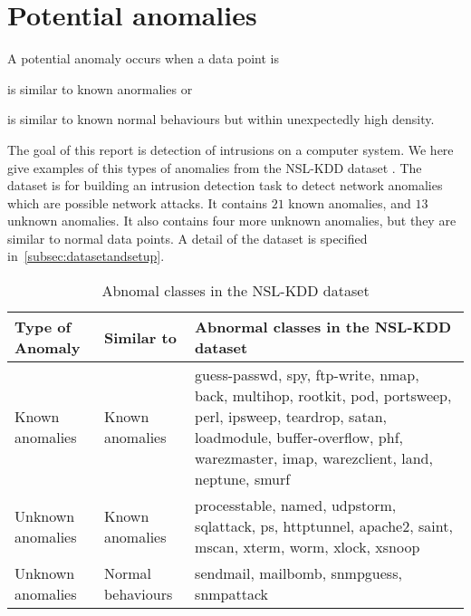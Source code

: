 \section{Potential anomalies}
A potential anomaly occurs when a data point is \begin{inparaenum}
\item is similar to known anormalies %
or 
\item is similar to known normal behaviours but within unexpectedly high density.
\end{inparaenum} 

The goal of this report is detection of intrusions on a computer system. 
We here give examples of this types of anomalies from the NSL-KDD dataset \cite{tavallaee09}. 
The dataset is for building an intrusion detection task to detect network anomalies which are possible network attacks. 
It contains $21$ known anomalies, and $13$ unknown anomalies. 
It also contains four more unknown anomalies, but they are similar to normal data points.
A detail of the dataset is specified in~\ref{subsec:datasetandsetup}. 

\begin{table}[h]
\begin{center}
\begin{tabular}{| l | l | p{5cm} |}
\hline
Type of Anomaly & Similar to & Abnormal classes in the NSL-KDD dataset \\
\hline
Known anomalies & Known anomalies & guess-passwd, spy, ftp-write, nmap, back, multihop, rootkit, pod, portsweep, perl, ipsweep, teardrop, satan, loadmodule, buffer-overflow, phf, warezmaster, imap, warezclient, land, neptune, smurf \\ %
\hline
Unknown anomalies & Known anomalies & processtable, named, udpstorm, sqlattack, ps, httptunnel, apache2, saint, mscan, xterm, worm, xlock, xsnoop \\ %
\hline
Unknown anomalies & Normal behaviours & sendmail, mailbomb, snmpguess, snmpattack \\ %
\hline
\end{tabular}
\end{center}
\caption{Abnomal classes in the NSL-KDD dataset}
\label{fig:anomalyclasses}
\end{table}
